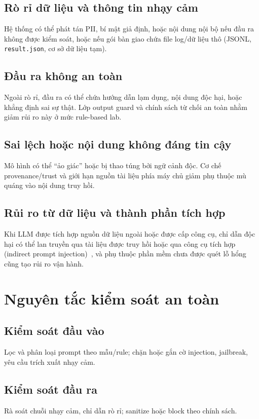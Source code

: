 \subsection{Rò rỉ dữ liệu và thông tin nhạy cảm}

Hệ thống có thể phát tán PII, bí mật giả định, hoặc nội dung nội bộ nếu đầu ra không được kiểm soát, hoặc nếu gói bàn giao chứa file log/dữ liệu thô (JSONL, \texttt{result.json}, cơ sở dữ liệu tạm).

\subsection{Đầu ra không an toàn}

Ngoài rò rỉ, đầu ra có thể chứa hướng dẫn lạm dụng, nội dung độc hại, hoặc khẳng định sai sự thật. Lớp output guard và chính sách từ chối an toàn nhằm giảm rủi ro này ở mức rule-based lab.

\subsection{Sai lệch hoặc nội dung không đáng tin cậy}

Mô hình có thể ``ảo giác'' hoặc bị thao túng bởi ngữ cảnh độc. Cơ chế provenance/trust và giới hạn nguồn tài liệu phía máy chủ giảm phụ thuộc mù quáng vào nội dung truy hồi.

\subsection{Rủi ro từ dữ liệu và thành phần tích hợp}

Khi LLM được tích hợp nguồn dữ liệu ngoài hoặc được cấp công cụ, chỉ dẫn độc hại có thể lan truyền qua tài liệu được truy hồi hoặc qua công cụ tích hợp (indirect prompt injection)~\cite{zhan2024injecagent}, và phụ thuộc phần mềm chưa được quét lỗ hổng cũng tạo rủi ro vận hành.

\section{Nguyên tắc kiểm soát an toàn}

\subsection{Kiểm soát đầu vào}
Lọc và phân loại prompt theo mẫu/rule; chặn hoặc gắn cờ injection, jailbreak, yêu cầu trích xuất nhạy cảm.

\subsection{Kiểm soát đầu ra}
Rà soát chuỗi nhạy cảm, chỉ dẫn rò rỉ; sanitize hoặc block theo chính sách.

